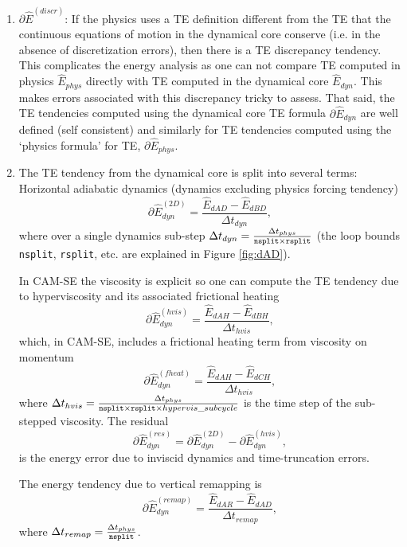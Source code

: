 \documentclass{agujournal}
\newcommand*{\gi}[1]{\widehat{#1}}
\begin{document}
\begin{enumerate}
\item $\partial \gi{E}^{({discr})}$: If the physics uses a TE definition different from the TE that the continuous equations of motion in the dynamical core conserve (i.e. in the absence of discretization errors), then there is a TE discrepancy tendency. This complicates the energy analysis as one can not compare TE computed in physics $\gi{E}_{phys}$ directly with TE computed in the dynamical core $\gi{E}_{dyn}$. This makes errors associated with this discrepancy tricky to assess. That said, the TE tendencies computed using the dynamical core TE formula $\partial \gi{E}_{dyn}$ are well defined (self consistent) and similarly for TE tendencies computed using the `physics formula' for TE, $\partial \gi{E}_{phys}$.


\item The TE tendency from the dynamical core is split into several terms:
Horizontal adiabatic dynamics (dynamics excluding physics forcing tendency)
\begin{equation}
\partial \gi{E}_{dyn}^{({2D})}=\frac{\gi{E}_{dAD}-\gi{E}_{dBD}}{\Delta t_{dyn}},
\end{equation}
where over a single dynamics sub-step $\Delta t_{dyn}=\frac{\Delta t_{phys}}{{\tt{nsplit}}\times {\tt{rsplit}}}$ (the loop bounds {\tt{nsplit}}, {\tt{rsplit}}, etc. are explained in Figure \ref{fig:dAD}).

In CAM-SE the viscosity is explicit so one can compute the TE tendency due to hyperviscosity and its associated frictional heating
\begin{equation}
\partial \gi{E}_{dyn}^{({hvis})}=\frac{\gi{E}_{dAH}-\gi{E}_{dBH}}{\Delta t_{hvis}},
\end{equation}
which, in CAM-SE, includes a frictional heating term from viscosity on momentum
\begin{equation}
\partial \gi{E}_{dyn}^{({fheat})}=\frac{\gi{E}_{dAH}-\gi{E}_{dCH}}{\Delta t_{hvis}},
\end{equation}
where $\Delta t_{hvis}=\frac{\Delta t_{phys}}{{\tt{nsplit}}\times {\tt{rsplit}} \times hypervis\_subcycle}$ is the time step of the sub-stepped viscosity. The residual
\begin{equation}
\partial \gi{E}_{dyn}^{(res)}=\partial \gi{E}_{dyn}^{({2D})}-\partial \gi{E}_{dyn}^{({hvis})},
\end{equation}
is the energy error due to inviscid dynamics and time-truncation errors.

The energy tendency due to vertical remapping is
\begin{equation}
\partial \gi{E}_{dyn}^{({remap})}=\frac{\gi{E}_{dAR}-\gi{E}_{dAD}}{\Delta t_{remap}},
\end{equation}
where $\Delta t_{remap}=\frac{\Delta t_{phys}}{{\tt{nsplit}}}$.


\end{enumerate}
\end{document}
